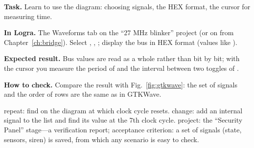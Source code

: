 \begin{diybox}
\textbf{Task.} Learn to use the diagram: choosing signals, the HEX format, the cursor for measuring time.

\textbf{In Logra.} The Waveforms tab on the ``27 MHz blinker'' project (or on  from Chapter~\ref{ch:bridge}). Select , , ; display the bus in HEX format (values like ).

\textbf{Expected result.} Bus values are read as a whole rather than bit by bit; with the cursor you measure the period of  and the interval between two toggles of .

\textbf{How to check.} Compare the result with Fig.~\ref{fig:gtkwave}: the set of signals and the order of rows are the same as in GTKWave.

 repeat: find on the diagram at which clock cycle  resets.  change: add an internal signal to the list and find its value at the 7th clock cycle.  project: the ``Security Panel'' stage---a verification report; acceptance criterion: a set of signals (state, sensors, siren) is saved, from which any scenario is easy to check.
\end{diybox}
